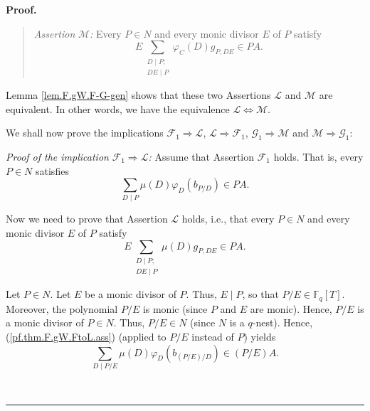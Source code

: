 \documentclass[numbers=enddot,12pt,final,onecolumn,notitlepage]{scrartcl}%
\theoremstyle{definition}
\newenvironment{statement}{\begin{quote}}{\end{quote}}
\newenvironment{proof}[1][Proof]{\noindent\textbf{#1.} }{\ \rule{0.5em}{0.5em}}
\let\sumnonlimits\sum
\renewcommand{\sum}{\sumnonlimits\limits}
\begin{document}
\begin{proof}
\begin{statement}
\end{statement}

\begin{statement}
\textit{Assertion }$\mathcal{M}$\textit{:} Every $P\in N$ and every monic
divisor $E$ of $P$ satisfy%
\[
E\sum_{\substack{D\mid P;\\DE\mid P}}\varphi_{C}\left(  D\right)  g_{P,DE}\in
PA.
\]

\end{statement}

Lemma \ref{lem.F.gW.F-G-gen} shows that these two Assertions $\mathcal{L}$ and
$\mathcal{M}$ are equivalent. In other words, we have the equivalence
$\mathcal{L}\Longleftrightarrow\mathcal{M}$.

We shall now prove the implications $\mathcal{F}_{1}\Longrightarrow
\mathcal{L}$, $\mathcal{L}\Longrightarrow\mathcal{F}_{1}$, $\mathcal{G}%
_{1}\Longrightarrow\mathcal{M}$ and $\mathcal{M}\Longrightarrow\mathcal{G}%
_{1}$:

\textit{Proof of the implication }$\mathcal{F}_{1}\Longrightarrow\mathcal{L}%
$\textit{:} Assume that Assertion $\mathcal{F}_{1}$ holds. That is, every
$P\in N$ satisfies%
\begin{equation}
\sum_{D\mid P}\mu\left(  D\right)  \varphi_{D}\left(  b_{P/D}\right)  \in PA.
\label{pf.thm.F.gW.FtoL.ass}%
\end{equation}


Now we need to prove that Assertion $\mathcal{L}$ holds, i.e., that every
$P\in N$ and every monic divisor $E$ of $P$ satisfy%
\begin{equation}
E\sum_{\substack{D\mid P;\\DE\mid P}}\mu\left(  D\right)  g_{P,DE}\in PA.
\label{pf.thm.F.gW.FtoL.goal}%
\end{equation}


Let $P\in N$. Let $E$ be a monic divisor of $P$. Thus, $E\mid P$, so that
$P/E\in\mathbb{F}_{q}\left[  T\right]  $. Moreover, the polynomial $P/E$ is
monic (since $P$ and $E$ are monic). Hence, $P/E$ is a monic divisor of $P\in
N$. Thus, $P/E\in N$ (since $N$ is a $q$-nest). Hence,
(\ref{pf.thm.F.gW.FtoL.ass}) (applied to $P/E$ instead of $P$) yields%
\begin{equation}
\sum_{D\mid P/E}\mu\left(  D\right)  \varphi_{D}\left(  b_{\left(  P/E\right)
/D}\right)  \in\left(  P/E\right)  A. \label{pf.thm.F.gW.FtoL.2}%
\end{equation}



\end{proof}
\end{document}
